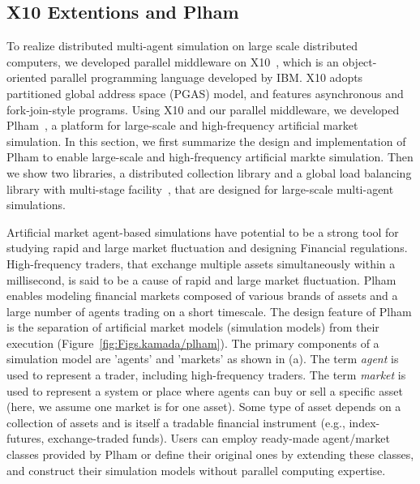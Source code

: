 \subsection{X10 Extentions and Plham}
\label{ss:X10 Extentions and Plham}

To realize distributed multi-agent simulation on large scale distributed computers,
we developed parallel middleware on X10~\cite{x10},
which is an object-oriented parallel programming language developed by IBM.
X10 adopts partitioned global address space (PGAS) model,
and features asynchronous and fork-join-style programs.
Using X10 and our parallel middleware, we developed Plham~\cite{toriiPlham,arob17plham}, 
a platform for large-scale and high-frequency artificial
market simulation.
In this section, we first summarize the design and implementation of Plham to enable 
large-scale and high-frequency artificial markte simulation.
Then we show two libraries, 
a distributed collection library and
a global load balancing library with multi-stage facility~\cite{glb2m}, 
that are designed for large-scale multi-agent simulations.

Artificial market agent-based simulations have potential to be a strong tool for studying rapid and large market fluctuation and designing Financial regulations.
High-frequency traders, that exchange multiple assets simultaneously within a millisecond,
is said to be a cause of rapid and large market fluctuation.
Plham enables modeling financial markets
composed of various brands of assets and a large number of agents trading on a short timescale.
The design feature of Plham is the separation
of artificial market models (simulation models) from their execution (Figure~\ref{fig:Figs.kamada/plham}).
The primary components of a simulation model are 'agents' and 'markets' as shown in (a).
The term \textit{agent} is used to represent a trader, including high-frequency traders.
The term \textit{market} is used to represent a system or place where agents can buy or sell a specific asset (here, we assume one market is for one asset).
Some type of asset depends on a collection of assets and is itself a tradable financial instrument (e.g., index-futures, exchange-traded funds). 
Users can employ ready-made agent/market classes provided by Plham or define
their original ones by extending these classes,
and construct their simulation models without parallel computing expertise.

